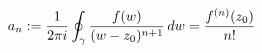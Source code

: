 \documentclass[preview]{standalone}
\begin{document}
\begin{align*}
\special{dvisvgm:raw <g id='unique000'>}a_n := \frac{1}{2\pi i} \oint_{\gamma} \frac{f(w)}{(w-z_0)^{n+1}}\, dw = \frac{f^{(n)}(z_0)}{n!}\special{dvisvgm:raw </g>}
\end{align*}
\end{document}

